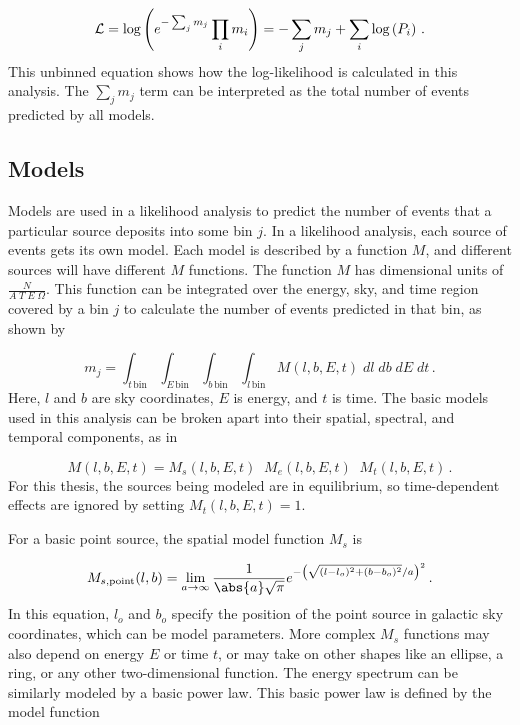 \begin{equation}\label{eqn:simple_like_8}
  \mathcal{L} = \textrm{log} \left ( e^{- \sum_j m_j} \prod_i m_i \right ) = - \sum_j m_j + \sum_i \textrm{log} \left ( P_i \right ) \,.
\end{equation}
This unbinned equation shows how the log-likelihood is calculated in this analysis.
The $\sum_{j} m_{j}$ term can be interpreted as the total number of events predicted by all models.

\subsection{Models}\label{sec:model_irf_folding}

Models are used in a likelihood analysis to predict the number of events that a particular source deposits into some bin $j$.
In a likelihood analysis, each source of events gets its own model.
Each model is described by a function $M$, and different sources will have different $M$ functions.
The function $M$ has dimensional units of $\frac{N}{A \; T \; E \; \Omega}$.
This function can be integrated over the energy, sky, and time region covered by a bin $j$ to calculate the number of events predicted in that bin, as shown by 

\begin{equation}\label{eqn:model_int}
  m_{j} = \int_{t\,\textrm{bin}} \int_{E\,\textrm{bin}} \int_{b\,\textrm{bin}} \int_{l\,\textrm{bin}} M(l,b,E,t)\; dl \; db \; dE \; dt \,.
\end{equation}
Here, $l$ and $b$ are sky coordinates, $E$ is energy, and $t$ is time.
The basic models used in this analysis can be broken apart into their spatial, spectral, and temporal components, as in

\begin{equation}\label{eqn:modelparts}
  M(l,b,E,t) = M_s(l,b,E,t) \; \; M_e(l,b,E,t) \; \; M_t(l,b,E,t) \,.
\end{equation}
For this thesis, the sources being modeled are in equilibrium, so time-dependent effects are ignored by setting $M_{t}(l,b,E,t) = 1$.

For a basic point source, the spatial model function $M_s$ is

\begin{equation}\label{eqn:pntsrc_Ms}
  M_{s,\textrm{point}}(l,b) = \lim_{a\to\infty} \frac{1}{ \abs{a} \sqrt{\pi} } e^{ - \left ( \sqrt{ (l-l_o)^2 + (b-b_o)^2 }/a \right )^2 } \,.
\end{equation}
In this equation, $l_o$ and $b_o$ specify the position of the point source in galactic sky coordinates, which can be model parameters.
More complex $M_s$ functions may also depend on energy $E$ or time $t$, or may take on other shapes like an ellipse, a ring, or any other two-dimensional function.
The energy spectrum can be similarly modeled by a basic power law.
This basic power law is defined by the model function

